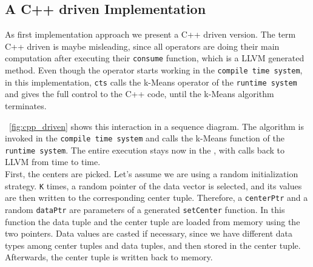 \subsection{A C++ driven Implementation}

As first implementation approach we present a C++ driven version. The term C++ driven is maybe misleading, since all operators are doing their main computation after executing their \texttt{consume} function, which is a LLVM generated method. Even though the operator starts working in the \texttt{compile time system}, in this implementation, \texttt{cts} calls the k-Means operator of the \texttt{runtime system} and gives the full control to the C++ code, until the k-Means algorithm terminates. 

~\autoref{fig:cpp_driven} shows this interaction in a sequence diagram. The algorithm is invoked in the \texttt{compile time system} and calls the k-Means function of the \texttt{runtime system}. The entire execution stays now in the , with calls back to LLVM from time to time. 
\\
First, the centers are picked. Let’s assume we are using a random initialization strategy. \texttt{K} times, a random pointer of the data vector is selected, and its values are then written to the corresponding center tuple. Therefore, a \texttt{centerPtr} and a random \texttt{dataPtr} are parameters of a generated \texttt{setCenter} function. In this function the data tuple and the center tuple are loaded from memory using the two pointers. Data values are casted if necessary, since we have different data types among center tuples and data tuples, and then stored in the center tuple. Afterwards, the center tuple is written back to memory.

